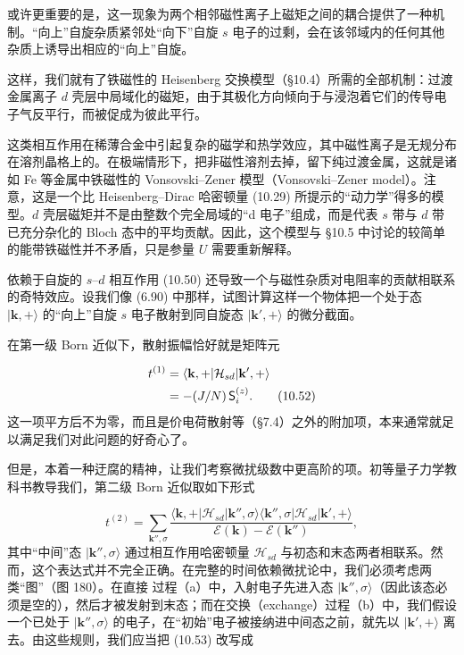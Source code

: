 或许更重要的是，这一现象为两个相邻磁性离子上磁矩之间的耦合提供了一种机制。“向上”自旋杂质紧邻处“向下”自旋 $s$ 电子的过剩，会在该邻域内的任何其他杂质上诱导出相应的“向上”自旋。


这样，我们就有了铁磁性的 Heisenberg 交换模型（§10.4）所需的全部机制：过渡金属离子 $d$ 壳层中局域化的磁矩，由于其极化方向倾向于与浸泡着它们的传导电子气反平行，而被促成为彼此平行。

这类相互作用在稀薄合金中引起复杂的磁学和热学效应，其中磁性离子是无规分布在溶剂晶格上的。在极端情形下，把非磁性溶剂去掉，留下纯过渡金属，这就是诸如 Fe 等金属中铁磁性的 Vonsovski--Zener 模型（Vonsovski--Zener model）。注意，这是一个比 Heisenberg--Dirac 哈密顿量 (10.29) 所提示的“动力学”得多的模型。$d$ 壳层磁矩并不是由整数个完全局域的“d 电子”组成，而是代表 $s$ 带与 $d$ 带已充分杂化的 Bloch 态中的平均贡献。因此，这个模型与 §10.5 中讨论的较简单的能带铁磁性并不矛盾，只是参量 $U$ 需要重新解释。

依赖于自旋的 $s$–$d$ 相互作用 (10.50) 还导致一个与磁性杂质对电阻率的贡献相联系的奇特效应。设我们像 (6.90) 中那样，试图计算这样一个物体把一个处于态 $|\mathbf{k},+\rangle$ 的“向上”自旋 $s$ 电子散射到同自旋态 $|\mathbf{k}',+\rangle$ 的微分截面。

在第一级 Born 近似下，散射振幅恰好就是矩阵元

\begin{align*}
t^{(1)} &= \langle \mathbf{k}, + | \mathcal{H}_{sd} | \mathbf{k}', + \rangle \notag \\
&= -(J/N)\, \mathsf{S}_i^{(z)}. \tag{10.52}
\end{align*}
这一项平方后不为零，而且是价电荷散射等（§7.4）之外的附加项，本来通常就足以满足我们对此问题的好奇心了。


但是，本着一种迂腐的精神，让我们考察微扰级数中更高阶的项。初等量子力学教科书教导我们，第二级 Born 近似取如下形式

\begin{equation*}
t^{(2)} = \sum_{\mathbf{k}'',\sigma} \frac{\langle \mathbf{k}, + | \mathcal{H}_{sd} | \mathbf{k}'', \sigma \rangle \langle \mathbf{k}'', \sigma | \mathcal{H}_{sd} | \mathbf{k}', + \rangle}{\mathcal{E}(\mathbf{k}) - \mathcal{E}(\mathbf{k}'')}, \tag{10.53}
\end{equation*}
其中“中间”态 $|\mathbf{k}'',\sigma\rangle$ 通过相互作用哈密顿量 $\mathcal{H}_{sd}$ 与初态和末态两者相联系。然而，这个表达式并不完全正确。在完整的时间依赖微扰论中，我们必须考虑两类“图”（图 180）。在直接
过程（a）中，入射电子先进入态 $|\mathbf{k}'',\sigma\rangle$（因此该态必须是空的），然后才被发射到末态；而在交换（exchange）过程（b）中，我们假设一个已处于 $|\mathbf{k}'',\sigma\rangle$ 的电子，在“初始”电子被接纳进中间态之前，就先以 $|\mathbf{k}',+\rangle$ 离去。由这些规则，我们应当把 (10.53) 改写成


